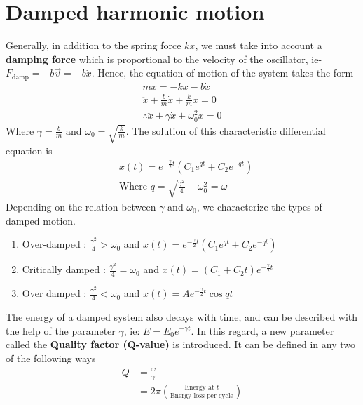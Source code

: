 \documentclass[a4paper]{article}
\begin{document}
\section{Damped harmonic motion}
Generally, in addition to the spring force $kx$, we must take into account a \textbf{damping force} which is proportional to the velocity of the oscillator, ie- $F_{\text{damp}} = -b\vec{v} = -b\dot{x}$. Hence, the equation of motion of the system takes the form
\begin{align*}
    m\ddot{x} = -kx-b\dot{x}\\
    \ddot{x}+\frac{b}{m}\dot{x}+\frac{k}{m}x = 0\\
    \therefore \ddot{x} + \gamma\dot{x} + \omega_0^2 x = 0
\end{align*}
Where $\gamma = \frac{b}{m}$ and $\omega_0 = \sqrt{\frac{k}{m}}$. The solution of this characteristic differential equation is 
\begin{align*}
    &x(t) = e^{-\frac{\gamma}{2}t}(C_1e^{qt} + C_2e^{-qt})\\
    &\text{Where } q = \sqrt{\frac{\gamma^2}{4}-\omega_0^2} = \omega
\end{align*}
Depending on the relation between $\gamma$ and $\omega_0$, we characterize the types of damped motion. 
\begin{enumerate}
    \item Over-damped : $\frac{\gamma^2}{4} > \omega_0$ and $x(t) = e^{-\frac{\gamma}{2}t}(C_1e^{qt} + C_2e^{-qt})$ 
    \item Critically damped : $\frac{\gamma^2}{4} = \omega_0$ and $x(t) = (C_1+C_2t)e^{-\frac{\gamma}{2}t}$
    \item Over damped : $\frac{\gamma^2}{4} < \omega_0$ and $x(t) = Ae^{-\frac{\gamma}{2}t}\cos{qt}$
\end{enumerate}
The energy of a damped system also decays with time, and can be described with the help of the parameter $\gamma$, ie: $\boxed{E = E_0e^{-\gamma t}}$. In this regard, a new parameter called the \textbf{Quality factor (Q-value)} is introduced. It can be defined in any two of the following ways
\begin{align*}
    Q &= \frac{\omega}{\gamma}\\
      &= 2\pi\left(\frac{\text{Energy at }t}{\text{Energy loss per cycle}}\right)
\end{align*}
\end{document}
